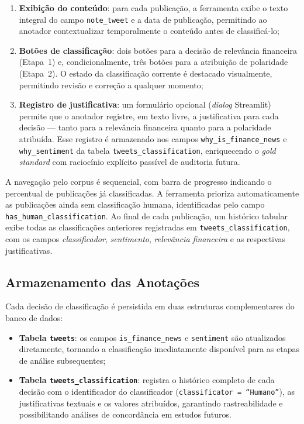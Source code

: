 \begin{enumerate}
	\item \textbf{Exibição do conteúdo}: para cada publicação, a ferramenta exibe o texto integral do campo \texttt{note\_tweet} e a data de publicação, permitindo ao anotador contextualizar
	temporalmente o conteúdo antes de classificá-lo;
	
	\item \textbf{Botões de classificação}: dois botões para a decisão de relevância financeira (Etapa~1) e, condicionalmente, três botões para a atribuição de polaridade (Etapa~2). O estado da classificação corrente é destacado visualmente, permitindo revisão e correção a qualquer momento;
	
	\item \textbf{Registro de justificativa}: um formulário opcional (\textit{dialog} Streamlit) permite que o anotador registre, em texto livre, a justificativa para cada decisão — tanto para a relevância financeira quanto para a polaridade atribuída. Esse registro é armazenado nos campos \texttt{why\_is\_finance\_news} e \texttt{why\_sentiment} da tabela \texttt{tweets\_classification}, enriquecendo o \textit{gold standard} com raciocínio explícito passível de auditoria futura.
\end{enumerate}

A navegação pelo corpus é sequencial, com barra de progresso indicando o percentual de publicações já classificadas. A ferramenta prioriza automaticamente as publicações ainda sem classificação
humana, identificadas pelo campo \texttt{has\_human\_classification}. Ao final de cada publicação, um histórico tabular exibe todas as classificações anteriores registradas em \texttt{tweets\_classification}, com os campos \textit{classificador}, \textit{sentimento}, \textit{relevância financeira} e as respectivas justificativas.

\subsection{Armazenamento das Anotações}
\label{subsec:armazenamento_anotacoes}

Cada decisão de classificação é persistida em duas estruturas complementares do banco de dados:

\begin{itemize}
	\item \textbf{Tabela \texttt{tweets}}: os campos \texttt{is\_finance\_news} e \texttt{sentiment} são atualizados diretamente, tornando a classificação imediatamente disponível para as etapas de análise subsequentes;
	
	\item \textbf{Tabela \texttt{tweets\_classification}}: registra o histórico completo de cada decisão com o identificador do classificador (\texttt{classificator = ``Humano''}), as justificativas textuais e os valores atribuídos, garantindo rastreabilidade e possibilitando análises de concordância em estudos futuros.
\end{itemize}


